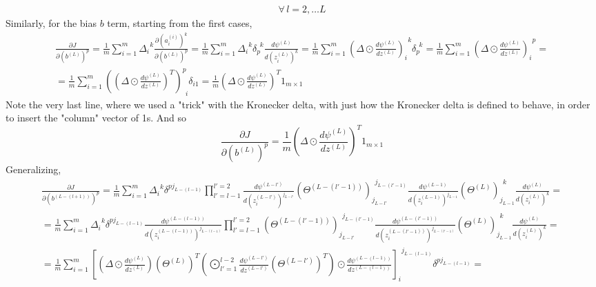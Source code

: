 \documentclass[10pt]{amsart}
\begin{document}
\begin{multicols*}{2}
\begin{equation}
{\begin{gathered}
	\forall \, l = 2,\dots L 
	\end{gathered}}
\end{equation}
Similarly, for the bias $b$ term, starting from the first cases, 
\[
\begin{gathered}
\frac{ \partial J }{ \partial (b^{(L)})^p} = \frac{1}{m} \sum_{i=1}^m \Delta_i^{\  \  k}  \frac{ \partial (a_i^{(i)})^k }{ \partial (b^{(L)})^p} = \frac{1}{m} \sum_{i=1}^m \Delta_i^{\  \  k} \delta_p^{\  \  k} \frac{d \psi^{(L)} }{ d(z_i^{(L)})^k} = \frac{1}{m} \sum_{i=1}^m (\Delta \odot \frac{d\psi^{(L)}}{ dz^{(L)}} )_i^{\  \  k} \delta_p^{\  \  k} = \frac{1}{m} \sum_{i=1}^m (\Delta \odot \frac{d\psi^{(L)}}{ dz^{(L)}})_i^{\  \  p} = \\
= \frac{1}{m} \sum_{i=1}^m ((\Delta \odot \frac{d\psi^{(L)}}{dz^{(L)}})^T)^p_{\  \  i } \delta_{i1} = \frac{1}{m} ( \Delta \odot \frac{d\psi^{(L)}}{dz^{(L)}})^T 1_{m\times 1}
\end{gathered}
\]
Note the very last line, where we used a "trick" with the Kronecker delta, with just how the Kronecker delta is defined to behave, in order to insert the "column" vector of 1s.  And so 
\begin{equation}
\frac{\partial J}{ \partial (b^{(L)})^p } = \frac{1}{m} ( \Delta \odot \frac{d\psi^{(L)}}{dz^{(L)}})^T 1_{m\times 1}  
\end{equation}
Generalizing, 
\[
\begin{gathered}
\frac{ \partial J }{ \partial (b^{(L-(l+1) )} )^p } = \frac{1}{m} \sum_{i=1}^m \Delta_i^{\  \  k} \delta^{pj_{L-(l-1)}} \prod_{l'=l-1}^{l'=2} \frac{d\psi^{(L-l')}}{ d(z_i^{(L-l')})^{j_{L-l'}} } (\Theta^{(L-(l'-1))})_{j_{L-l'}}^{\  \  j_{L-(l'-1)}} \frac{d \psi^{(L-1)} }{ d(z_i^{(L-1)})^{j_{L-1}} } (\Theta^{(L)})_{j_{L-1}}^{ \  \ k } \frac{d\psi^{(L)} }{ d(z_i^{(L)})^k }  = \\
= \frac{1}{m} \sum_{i=1}^m \Delta_i^{\  \  k} \delta^{pj_{L-(l-1)}} \frac{d\psi^{(L-(l-1))} }{ d(z_i^{(L-(l-1))})^{j_{L-(l-1)}} }    \prod_{l'=l-1}^{l'=2} (\Theta^{(L-(l'-1))})_{j_{L-l'}}^{ \  \  j_{L-(l'-1)}} \frac{d \psi^{(L-(l'-1))} }{ d (z_i^{(L-(l'-1))})^{j_{L-(l'-1)}} } (\Theta^{(L)})_{j_{L-1}}^{\  \  k } \frac{d \psi^{(L)} }{ d(z_i^{(L)})^k}	= \\
= \frac{1}{m} \sum_{i=1}^m \left[ (\Delta \odot \frac{d\psi^{(L)} }{ dz^{(L)} } )(\Theta^{(L)})^T \left( \bigodot^{l-2}_{ l'=1} \frac{d \psi^{(L-l')} }{ dz^{(L-l')}} (\Theta^{(L-l')})^T \right) \odot \frac{d\psi^{ (L-(l-1))} }{ dz^{(L-(l-1))}} \right]_i^{\  \  j_{L-(l-1)}} \delta^{p j_{L-(l-1)}} = \\

\end{gathered}\]
\end{multicols*}
\end{document}

